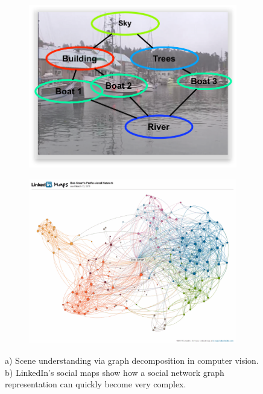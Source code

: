 \begin{figure}[ht]
    \begin{subfigure}{.45\linewidth}
        \centering
        \includegraphics[width=\linewidth]{Figures/scene}
        \caption{}
        \label{fig:scene}
    \end{subfigure}
    \begin{subfigure}{.45\linewidth}
        \centering
        \includegraphics[width=\linewidth]{Figures/linkedin-social-maps}
        \caption{}
        \label{fig:network}
    \end{subfigure}
\caption{a) Scene understanding via graph decomposition in computer vision. b)
        LinkedIn's social maps show how a social network graph representation
        can quickly become very complex.}
\end{figure}

